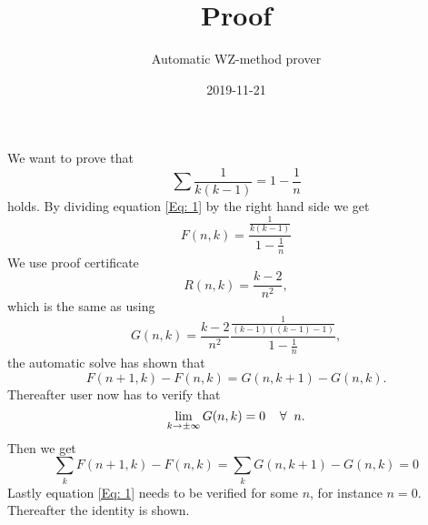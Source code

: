 \documentclass{article}
\title{Proof}
\author{Automatic WZ-method prover}
\date{2019-11-21}
\let\oldforall\forall
\renewcommand{\forall}{\hspace*{2mm}\oldforall\hspace*{1mm}}
\begin{document}
\maketitle
We want to prove that
\begin{equation}\label{Eq: 1}
\sum \frac{1}{k(k-1)} = 1-\frac{1}{n}
\end{equation}
holds. By dividing equation \ref{Eq: 1} by the right hand side we get
\begin{equation}
F(n,k)=\frac{\frac{1}{k(k-1)}}{1-\frac{1}{n}}
\end{equation}
We use proof certificate
\begin{equation}
R(n,k)=\frac{k-2}{n^2},
\end{equation}
which is the same as using
\begin{equation}
G(n,k)=\frac{k-2}{n^2}\frac{\frac{1}{(k-1)((k-1)-1)}}{1-\frac{1}{n}},
\end{equation}
the automatic solve has  shown that
\begin{equation}\label{Eq: WZ1}
F(n+1,k)-F(n,k)=G(n,k+1)-G(n,k).
\end{equation}
Thereafter user now has to verify that
\begin{equation}
\lim_{k\to\pm\infty}G(n,k)=0\forall n.
\end{equation}
Then we get
\begin{equation}
\sum_k F(n+1,k)-F(n,k)=\sum_k G(n,k+1)-G(n,k)=0\end{equation}Lastly equation \ref{Eq: 1} needs to be verified for some $n$, for instance $n=0$. Thereafter the identity is shown.
\end{document}
